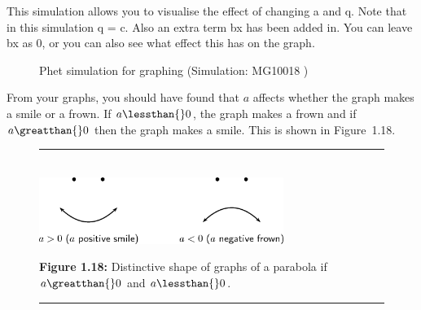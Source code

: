 \par
\label{m39345*eip-679}This simulation allows you to visualise the effect of changing a and q. Note that in this simulation q = c. Also an extra term bx has been added in. You can leave bx as 0, or you can also see what effect this has on the graph.
\par \label{m39345*eip-481}
\setcounter{subfigure}{0}
\begin{figure}[H] %
\textnormal{Phet simulation for graphing}\vspace{.1in} \nopagebreak
\label{m39345*phet!!!underscore!!!sim}\label{m39345*phet-simulation}
 { (Simulation:  MG10018 )}
\vspace{2pt}
\vspace{.1in}
\end{figure}       \par \label{m39345*id241684}From your graphs, you should have found that $a$ affects whether the graph makes a smile or a frown. If $a\lessthan{}0$, the graph makes a frown and if $a\greatthan{}0$ then the graph makes a smile. This is shown in Figure~1.18.\par 
\setcounter{subfigure}{0}
\begin{figure}[H] %
\begin{center}
\rule[.1in]{\figurerulewidth}{.005in} \\
\label{m39345*uid115!!!underscore!!!media}\label{m39345*uid115!!!underscore!!!printimage}\includegraphics[width=300px]{col11306.imgs/m39345_MG10C11_014.png} %
\vspace{2pt}
\vspace{\rubberspace}\par \begin{cnxcaption}
\small \textbf{Figure 1.18: }Distinctive shape of graphs of a parabola if $a\greatthan{}0$ and $a\lessthan{}0$.
\end{cnxcaption}
\vspace{.1in}
\rule[.1in]{\figurerulewidth}{.005in} \\
\end{center}
\end{figure}       
